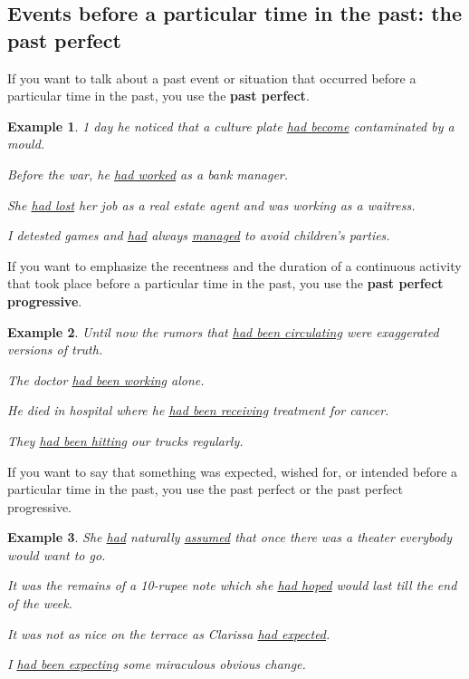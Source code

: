 \documentclass[oneside]{book}
\numberwithin{equation}{section}
\newtheorem{example}{Example}[section]
\begin{document}
\subsection{Events before a particular time in the past: the past perfect}
\noindent{} If you want to talk about a past event or situation that occurred before a particular time in the past, you use the \textbf{past perfect}.
\begin{example}
    1 day he noticed that a culture plate \underline{had become} contaminated by a mould.
    
    Before the war, he \underline{had worked} as a bank manager.
    
    She \underline{had lost} her job as a real estate agent and was working as a waitress.
    
    I detested games and \underline{had} always \underline{managed} to avoid children's parties.
\end{example}
%
\noindent{} If you want to emphasize the recentness and the duration of a continuous activity that took place before a particular time in the past, you use the \textbf{past perfect progressive}.
\begin{example}
    Until now the rumors that \underline{had been circulating} were exaggerated versions of truth.
    
    The doctor \underline{had been working} alone.
    
    He died in hospital where he \underline{had been receiving} treatment for cancer.
    
    They \underline{had been hitting} our trucks regularly.
\end{example}
%
\noindent{} If you want to say that something was expected, wished for, or intended before a particular time in the past, you use the past perfect or the past perfect progressive.
\begin{example}
    She \underline{had} naturally \underline{assumed} that once there was a theater everybody would want to go.
    
    It was the remains of a 10-rupee note which she \underline{had hoped} would last till the end of the week.
    
    It was not as nice on the terrace as Clarissa \underline{had expected}.
    
    I \underline{had been expecting} some miraculous obvious change.
\end{example}
\end{document}
